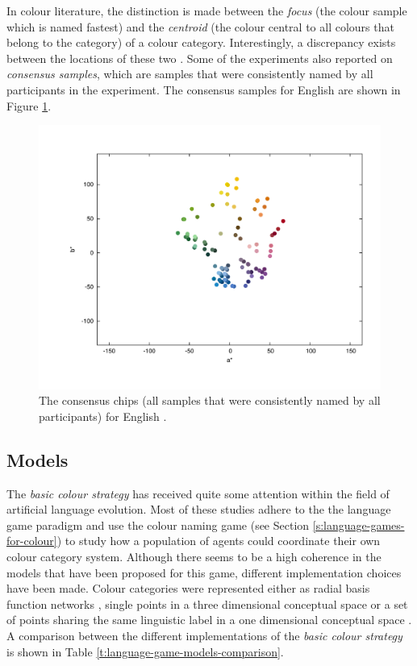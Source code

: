 In colour literature, the distinction is made between the \emph{focus}
(the colour sample which is named fastest) and the \emph{centroid}
(the colour central to all colours that belong to the category) of a
colour category. Interestingly, a discrepancy exists between the
locations of these two \citep{sturges95location}. Some of the
experiments also reported on \emph{consensus samples}, which are samples that were
consistently named by all participants in the experiment. The
consensus samples for English \citep{sturges95location} are shown in
Figure \ref{f:basic-consensus-chips-english}.

\begin{figure}[htbp]
  \begin{center}
    \includegraphics[width=.85\textwidth]{./basic-strategy/figures/sturges-consensus-chips.pdf}
    \caption[Consensus chips for English]{The consensus chips (all
      samples that were consistently named by all participants) for
      English \citep{sturges95location}.}
    \label{f:basic-consensus-chips-english}
  \end{center}
\end{figure}

\subsection{Models}

The \emph{basic colour strategy} has received quite some attention
within the field of artificial language evolution. Most of these
studies adhere to the the language game paradigm and use the colour
naming game (see Section \ref{s:language-games-for-colour}) to study
how a population of agents could coordinate their own colour category
system. Although there seems to be a high coherence in the models that
have been proposed for this game, different implementation choices
have been made. Colour categories were represented either as radial
basis function networks \citep{steels05coordinating}, single points in
a three dimensional conceptual space \citep{belpaeme05explaining,
  belpaeme07language} or a set of points sharing the same linguistic
label in a one dimensional conceptual space \citep{puglisi08cultural,
  baronchelli10modeling}. A comparison between the different
implementations of the \emph{basic colour strategy} is shown in Table
\ref{t:language-game-models-comparison}.

